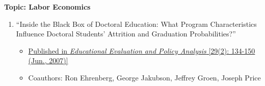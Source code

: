 \documentclass[11pt]{article}
\begin{document}
\medskip
\vspace*{.1in}
{\bf Topic: Labor Economics} \\
\vspace*{-.2in}
\begin{enumerate}
\item``Inside the Black Box of Doctoral Education: What Program Characteristics Influence Doctoral Students' Attrition and Graduation Probabilities?''
\begin{itemize}
\vspace*{-.07in}
	\item \href{https://www.jstor.org/stable/30128037?seq=1#page_scan_tab_contents}{Published in {\it Educational Evaluation and Policy Analysis} [29(2): 134-150 (Jun., 2007)]}
\vspace*{-.07in}
	\item Coauthors: Ron Ehrenberg, George Jakubson, Jeffrey Groen, Joseph Price
\end{itemize}
\end{enumerate}
\end{document}
